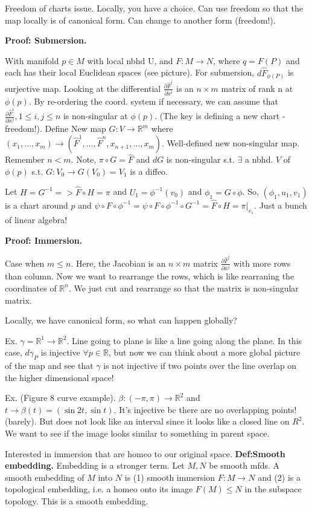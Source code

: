 \documentclass[12pt,letterpaper]{article}
\begin{document}
Freedom of charts issue. Locally, you have a choice. Can use freedom so that the map locally is of canonical form. Can change to another form (freedom!). 

\textbf{Proof: Submersion.}

With manifold $p\in M$ with local nbhd U, and $F: M \rightarrow N$, where $q=F(P)$ and each has their local Euclidean spaces (see picture). For submersion, $d\hat{F}_{\phi(P)}$ is surjective map. Looking at the differential $\frac{\partial \hat{F}^i}{\partial x^i}$ is an $n \times m $ matrix of rank n at $\phi(p)$. By re-ordering the coord. system if necessary, we can assume that $\frac{\partial \hat{F}^i}{\partial x^j}, 1 \leq i,j \leq n$ is non-singular at $\phi(p)$. (The key is defining a new chart - freedom!). Define New map $G: V \rightarrow \mathbb{R}^m$  where $(x_1, \dots, x_m) \rightarrow (\hat{F}^1, \dots, \hat{F}^n, x_{n+1}, \dots, x_m)$. Well-defined new non-singular map. Remember $n < m$. Note, $\pi \circ G = \hat{F}$ and $dG$ is non-singular s.t. $\exists$ a nbhd. $V$ of $\phi(p)$ s.t. $G: V_0 \rightarrow G(V_0)= V_1$ is a diffeo. 

Let $H = G^{-1} => \hat{F} \circ H = \pi$ and $U_1 = \phi^{-1} (v_0)$ and $\phi_1 = G \circ \phi$. So, $(\phi_1, u_1, v_1)$ is a chart around $p$ and $\psi \circ F \circ \phi^{-1} = \psi \circ F \circ \phi^{-1} \circ G^{-1} = \hat{F} \circ H = \pi|_{v_1}$. Just a bunch of linear algebra!

\textbf{Proof: Immersion.}

Case when $m \leq n$. Here, the Jacobian is an $n \times m $ matrix $\frac{\partial \hat{F}^i}{\partial x^j}$ with more rows than column. Now we want to rearrange the rows, which is like rearraning the coordinates of $\mathbb{R}^n$. We just cut and rearrange so that the matrix is non-singular matrix.

Locally, we have canonical form, so what can happen globally?

Ex. $\gamma = \mathbb{R}^1 \rightarrow \mathbb{R}^2$. Line going to plane is like a line going along the plane. In this case, $d\gamma_P$ is injective $\forall p \in \mathbb{R}$, but now we can think about a more global picture of the map and see that $\gamma$ is not injective if two points over the line overlap on the higher dimensional space!

Ex. (Figure 8 curve example). $\beta : (-\pi, \pi) \rightarrow \mathbb{R}^2$ and $t \rightarrow \beta(t) = (\sin2t, \sin t)$. It's injective bc there are no overlapping points! (barely). But does not look like an interval since it looks like a closed line on $R^2$. We want to see if the image looks similar to something in parent space.

Interested in immersion that are homeo to our original space. \textbf{Def:Smooth embedding. } Embedding is a stronger term. Let $M, N$ be smooth mfds. A smooth embedding of $M$ into $N$ is (1) smooth immersion $F: M \rightarrow N$ and (2) is a topological embedding, i.e. a homeo onto its image $F(M) \leq N$ in the subspace topology. This is a smooth embedding. 
\end{document}
